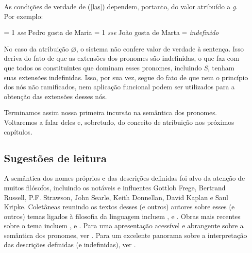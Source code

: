 \n As condições de verdade de (\ref{las}) dependem, portanto, do
valor atribuído a \textit{g}. Por exemplo:

\begin{exe}
	\ex
	\begin{xlist}
		\ex {} = 1 \textit{sse} Pedro gosta de Maria
		\ex {} = 1 \textit{sse} João gosta de Marta
		\ex {}\gvaz = \textit{indefinido} 
	\end{xlist}
\end{exe}

\n No caso da atribuição $\varnothing$, o sistema não confere
valor de verdade à sentença. Isso deriva do fato de que as
extensões dos pronomes são indefinidas, o que faz com que todos os
constituintes que dominam esses pronomes, incluindo \textit{S},
tenham suas extensões indefinidas. Isso, por sua vez, segue do
fato de que nem o princípio dos nós não ramificados, nem aplicação
funcional podem ser utilizados para a obtenção das extensões
desses nós.

Terminamos assim nossa primeira incursão na semântica dos
pronomes. Voltaremos a falar deles e, sobretudo, do conceito de
atribuição nos próximos capítulos.

\bigskip

\begin{tcolorbox}[parbox=false,boxrule=0pt,sharp corners,breakable]

\section*{Sugestões de leitura}

\n  A semântica dos nomes próprios e das descrições definidas foi alvo da atenção de muitos filósofos, incluindo os notáveis e influentes Gottlob Frege, Bertrand Russell, P.F. Strawson, John Searle, Keith Donnellan, David Kaplan e Saul Kripke. Coletâneas reunindo os textos desses (e outros) autores sobre esses (e outros) temas ligados à filosofia da linguagem incluem \cite{ostertag98}, \cite{martinich01} e \cite{ludlow98}. Obras mais recentes sobre o tema incluem \cite{abbott10}, \cite{elbourne13} e \cite{neale90}. Para uma apresentação acessível e abrangente sobre a semântica dos pronomes, ver \cite{buring05}. Para um excelente panorama sobre a interpretação das descrições definidas (e indefinidas), ver \cite{heim91}.

\end{tcolorbox}

